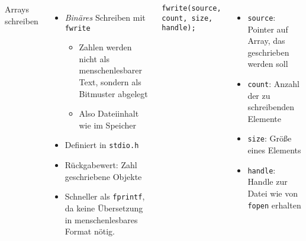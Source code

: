 \begin{frame}[fragile]
%
\begin{columns}[T]
\begin{Large}
Arrays schreiben
\vspace{10pt}
\end{Large}
%
\begin{itemize}
\item \emph{Binäres} Schreiben mit \texttt{fwrite}
\begin{itemize}
	\item Zahlen werden nicht als menschenlesbarer Text, sondern als Bitmuster abgelegt
	\item Also Dateiinhalt wie im Speicher
\end{itemize}
\item Definiert in \texttt{stdio.h}
\item Rückgabewert: Zahl geschriebene Objekte
\item Schneller als \texttt{fprintf}, da keine Übersetzung in menschenlesbares Format nötig.
\end{itemize}
%
\begin{codebox}[Syntax]
\begin{verbatim}
fwrite(source, count, size, handle);
\end{verbatim}
\end{codebox}
%
\begin{itemize}
\item \texttt{source}: Pointer auf Array, das geschrieben werden soll
\item \texttt{count}: Anzahl der zu schreibenden Elemente
\item \texttt{size}: Größe eines Elements
\item \texttt{handle}: Handle zur Datei wie von \texttt{fopen} erhalten
\end{itemize}
\end{columns}
%
\end{frame}


